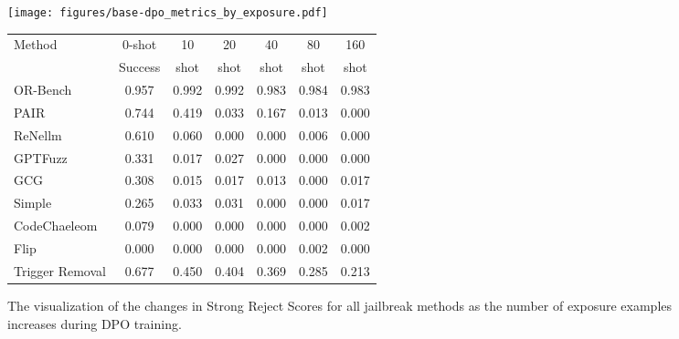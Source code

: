 \begin{figure}[h]
    \centering
    \newcommand{\LeftAdjust}{0em}
    \begin{minipage}[t]{0.49\textwidth}
    \vspace*{\LeftAdjust}
        \centering    
        \texttt{[image: figures/base-dpo\_metrics\_by\_exposure.pdf]}
        \vspace{-2.0em}
        \caption{The visualization of the changes in Strong Reject Scores for all jailbreak methods as the number of exposure examples increases during DPO training.}
        \label{fig:dpo}
    \end{minipage}
    \hfill
    \newcommand{\RightAdjust}{0em}
    \begin{minipage}[t]{0.49\textwidth}
    \vspace*{\RightAdjust}
        \fontsize{8}{11}\selectfont
        \centering
        \setlength{\tabcolsep}{4pt}
        \label{tab:sft_scores}
        \vspace{-1.2em}
        \begin{tabular}{lcccccc}
        \toprule
        Method & 0-shot & 10 & 20 & 40 & 80 & 160 \\
            & Success   & shot & shot & shot & shot & shot \\
        \midrule
        OR-Bench & 0.957 & 0.992 & 0.992 & 0.983 & 0.984 & 0.983 \\
        PAIR & 0.744 & 0.419 & 0.033 & 0.167 & 0.013 & 0.000 \\
        ReNellm & 0.610 & 0.060 & 0.000 & 0.000 & 0.006 & 0.000 \\
        GPTFuzz & 0.331 & 0.017 & 0.027 & 0.000 & 0.000 & 0.000 \\
        GCG & 0.308 & 0.015 & 0.017 & 0.013 & 0.000 & 0.017 \\
        Simple & 0.265 & 0.033 & 0.031 & 0.000 & 0.000 & 0.017 \\
        CodeChaeleom & 0.079 & 0.000 & 0.000 & 0.000 & 0.000 & 0.002 \\
        Flip & 0.000 & 0.000 & 0.000 & 0.000 & 0.002 & 0.000 \\
        \midrule
        Trigger Removal & 0.677 & 0.450 & 0.404 & 0.369 & 0.285 & 0.213 \\
        \bottomrule
        \end{tabular}
    \end{minipage}
\end{figure}

